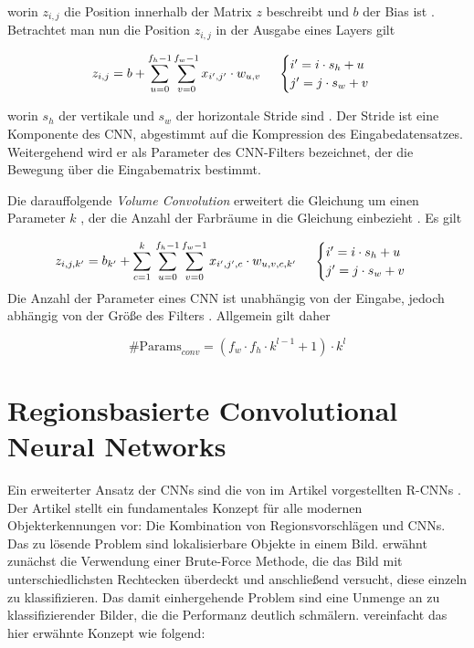 worin $z_{i,j}$ die Position innerhalb der Matrix $z$ beschreibt und $b$ der \gls{Bias} ist \cite[6]{karl2020}. Betrachtet man nun die Position $z_{i,j}$ in der Ausgabe eines Layers gilt 

\begin{equation}
	z_{i,j}=b+\sum_{u=0}^{f_{h}-1}\sum_{v=0}^{f_{w}-1}{x_{i',j'}\cdot w_{u,v}}\text{  \space\space\space    } \begin{cases}
	i' = i \cdot s_{h} + u \\ j' = j \cdot s_{w} + v 
\end{cases}
\end{equation}

worin $s_h$ der vertikale und $s_w$ der horizontale Stride sind \cite[13\psq]{karl2020}. Der Stride ist eine Komponente des \ac{CNN}, abgestimmt auf die Kompression des Eingabedatensatzes. Weitergehend wird er als Parameter des \ac{CNN}-Filters bezeichnet, der die Bewegung  über die Eingabematrix bestimmt.

Die darauffolgende \emph{Volume Convolution} erweitert die Gleichung um einen Parameter $k$ , der die Anzahl der Farbräume in die Gleichung einbezieht \cites[25]{karl2020}[365]{Géron2017}. Es gilt
	
\begin{equation}
	z_{i,j,k'}=b_{k'}+\sum_{c=1}^k{}\sum_{u=0}^{f_{h}-1}\sum_{v=0}^{f_{w}-1}{x_{i',j',c}\cdot w_{u,v,c,k'}}\text{  \space\space\space    } \begin{cases}
	i' = i \cdot s_{h} + u \\ j' = j \cdot s_{w} + v 
\end{cases}
\end{equation}
Die Anzahl der Parameter eines \ac{CNN} ist unabhängig von der Eingabe, jedoch abhängig von der Größe des Filters \cite[28]{karl2020}. Allgemein gilt daher 

\begin{equation}
	\text{\#{ }Params}_{conv} = (f_{w} \cdot f_{h} \cdot k^{l-1} + 1) \cdot k^l
\end{equation}

\section{Regionsbasierte Convolutional Neural Networks}

Ein erweiterter Ansatz der \acp{CNN} sind die von \citeauthor{DBLP:journals/corr/GirshickDDM13} im Artikel  vorgestellten \acp{R-CNN} \cite{DBLP:journals/corr/GirshickDDM13}. Der Artikel stellt ein fundamentales Konzept für alle modernen Objekterkennungen vor: Die Kombination von Regionsvorschlägen und \acp{CNN}.
Das zu lösende Problem sind lokalisierbare Objekte in einem Bild. \citeauthor{DBLP:journals/corr/GirshickDDM13} erwähnt zunächst die Verwendung einer Brute-Force Methode, die das Bild mit unterschiedlichsten Rechtecken überdeckt und anschließend versucht, diese einzeln zu klassifizieren. Das damit einhergehende Problem sind eine Unmenge an zu klassifizierender Bilder, die die Performanz deutlich schmälern. \citeauthor{selfouly-rcnn} vereinfacht das hier erwähnte Konzept wie folgend:

